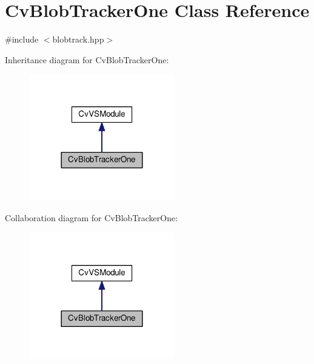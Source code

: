 \hypertarget{classCvBlobTrackerOne}{\section{Cv\-Blob\-Tracker\-One Class Reference}
\label{classCvBlobTrackerOne}
}


{\ttfamily \#include $<$blobtrack.\-hpp$>$}



Inheritance diagram for Cv\-Blob\-Tracker\-One\-:\nopagebreak
\begin{figure}[H]
\begin{center}
\leavevmode
\includegraphics[width=180pt]{classCvBlobTrackerOne__inherit__graph}
\end{center}
\end{figure}


Collaboration diagram for Cv\-Blob\-Tracker\-One\-:\nopagebreak
\begin{figure}[H]
\begin{center}
\leavevmode
\includegraphics[width=180pt]{classCvBlobTrackerOne__coll__graph}
\end{center}
\end{figure}
